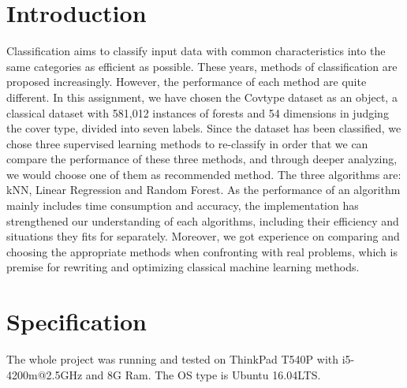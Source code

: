 \documentclass[12pt]{report}
\begin{document}
\section*{Introduction}
Classification aims to classify input data with common characteristics into the same categories as efficient as possible. These years, methods of classification are  proposed increasingly. However, the performance of each method are quite different. 
\newline
\newline
In this assignment, we have chosen the Covtype dataset as an object, a classical dataset with 581,012 instances of forests and 54 dimensions in judging the cover type, divided into seven labels. Since the dataset has been classified, we chose three supervised learning methods to re-classify in order that we can compare the performance of these three methods, and through deeper analyzing, we would choose one of them as recommended method. The three algorithms are: kNN, Linear Regression and Random Forest. 
\newline
\newline
As the performance of an algorithm mainly includes time consumption and accuracy, the implementation has strengthened our understanding of each algorithms, including their efficiency and situations they fits for separately. Moreover, we got experience on comparing and choosing the appropriate methods when confronting with real problems, which is premise for rewriting and optimizing classical machine learning methods.

\section*{Specification}
The whole project was running and tested on ThinkPad T540P with i5-4200m@2.5GHz and 8G Ram. 
\newline
The OS type is Ubuntu 16.04LTS. 
\end{document}
